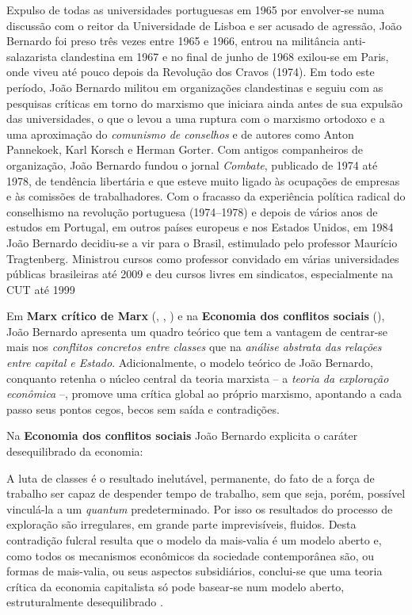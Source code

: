 Expulso de todas as universidades portuguesas em 1965 por envolver-se numa discussão com o reitor da Universidade de Lisboa e ser acusado de agressão, João Bernardo foi preso três vezes entre 1965 e 1966, entrou na militância anti-salazarista clandestina em 1967 e no final de junho de 1968 exilou-se em Paris, onde viveu até pouco depois da Revolução dos Cravos (1974). Em todo este período, João Bernardo militou em organizações clandestinas e seguiu com as pesquisas críticas em torno do marxismo que iniciara ainda antes de sua expulsão das universidades, o que o levou a uma ruptura com o marxismo ortodoxo e a uma aproximação do \textit{comunismo de conselhos} e de autores como Anton Pannekoek, Karl Korsch e Herman Gorter. Com antigos companheiros de organização, João Bernardo fundou o jornal \textit{Combate}, publicado de 1974 até 1978, de tendência libertária e que esteve muito ligado às ocupações de empresas e às comissões de trabalhadores. Com o fracasso da experiência política radical do conselhismo na revolução portuguesa (1974–1978) e depois de vários anos de estudos em Portugal, em outros países europeus e nos Estados Unidos, em 1984 João Bernardo decidiu-se a vir para o Brasil, estimulado pelo professor Maurício Tragtenberg. Ministrou cursos como professor convidado em várias universidades públicas brasileiras até 2009 e deu cursos livres em sindicatos, especialmente na CUT até 1999 \cite{BERNARDO2014} 

Em \textbf{Marx crítico de Marx} (\citeyear{BERNARDO1977a}, \citeyear{BERNARDO1977b}, \citeyear{BERNARDO1977c}) e na \textbf{Economia dos conflitos sociais} (\citeyear{BERNARDO1991}), João Bernardo apresenta um quadro teórico que tem a vantagem de centrar-se mais nos \textit{conflitos concretos entre classes} que na \textit{análise abstrata das relações entre capital e Estado}. Adicionalmente, o modelo teórico de João Bernardo, conquanto retenha o núcleo central da teoria marxista -- a \textit{teoria da exploração econômica} --, promove uma crítica global ao próprio marxismo, apontando a cada passo seus pontos cegos, becos sem saída e contradições.

Na \textbf{Economia dos conflitos sociais} João Bernardo explicita o caráter desequilibrado da economia:

\begin{citacao}
A luta de classes é o resultado inelutável, permanente, do fato de a força de trabalho ser capaz de despender tempo de trabalho, sem que seja, porém, possível vinculá-la a um \textit{quantum} predeterminado. Por isso os resultados do processo de exploração são irregulares, em grande parte imprevisíveis, fluidos. Desta contradição fulcral resulta que o modelo da mais-valia é um modelo aberto e, como todos os mecanismos econômicos da sociedade contemporânea são, ou formas de mais-valia, ou seus aspectos subsidiários, conclui-se que uma teoria crítica da economia capitalista só pode basear-se num modelo aberto, estruturalmente desequilibrado \cite[p.~62]{BERNARDO1991}. 
\end{citacao}

